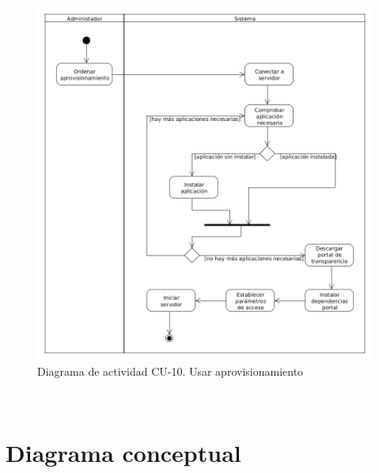 \begin{figure}[!ht]
  \begin{center}
  \includegraphics[width=1\textwidth]{imagenes/diag_act_cu_10.png}
  \caption{Diagrama de actividad CU-10. Usar aprovisionamiento}
  \label{fig:diag_act_cu_10}
  \end{center}
\end{figure}

\newpage
\
\newpage
\
\newpage
\
\newpage
\
\newpage
\
\newpage
\
\newpage
\
\newpage
\
\newpage

\section{Diagrama conceptual}

